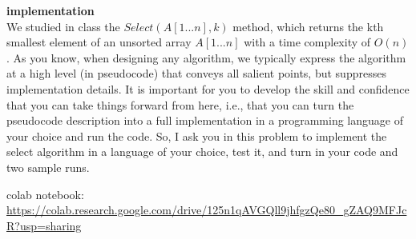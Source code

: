 \textbf{implementation} \\
We studied in class the $Select(A[1 . . . n], k)$ method, which returns the kth smallest element of an
unsorted array $A[1 . . . n]$ with a time complexity of $O(n)$. As you know, when designing any algorithm,
we typically express the algorithm at a high level (in pseudocode) that conveys all salient points, but
suppresses implementation details. It is important for you to develop the skill and confidence that
you can take things forward from here, i.e., that you can turn the pseudocode description into a full
implementation in a programming language of your choice and run the code. So, I ask you in this
problem to implement the select algorithm in a language of your choice, test it, and turn in your code
and two sample runs.

\begin{customsolutionbox}
    colab notebook: \url{https://colab.research.google.com/drive/125n1qAVGQll9jhfgzQe80_gZAQ9MFJcR?usp=sharing} \\
    
\end{customsolutionbox}